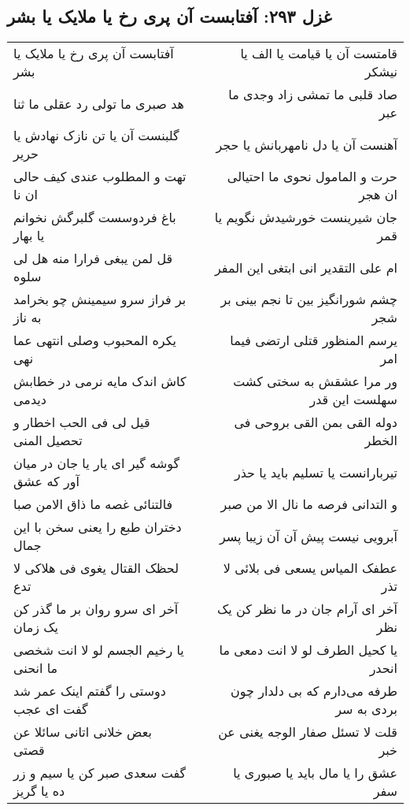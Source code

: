 \begin{center}
\section*{غزل ۲۹۳: آفتابست آن پری رخ یا ملایک یا بشر}
\label{sec:293}
\begin{longtable}{l p{0.5cm} r}
آفتابست آن پری رخ یا ملایک یا بشر
&&
قامتست آن یا قیامت یا الف یا نیشکر
\\
هد صبری ما تولی رد عقلی ما ثنا
&&
صاد قلبی ما تمشی زاد وجدی ما عبر
\\
گلبنست آن یا تن نازک نهادش یا حریر
&&
آهنست آن یا دل نامهربانش یا حجر
\\
تهت و المطلوب عندی کیف حالی ان نا
&&
حرت و المامول نحوی ما احتیالی ان هجر
\\
باغ فردوسست گلبرگش نخوانم یا بهار
&&
جان شیرینست خورشیدش نگویم یا قمر
\\
قل لمن یبغی فرارا منه هل لی سلوه
&&
ام علی التقدیر انی ابتغی این المفر
\\
بر فراز سرو سیمینش چو بخرامد به ناز
&&
چشم شورانگیز بین تا نجم بینی بر شجر
\\
یکره المحبوب وصلی انتهی عما نهی
&&
یرسم المنظور قتلی ارتضی فیما امر
\\
کاش اندک مایه نرمی در خطابش دیدمی
&&
ور مرا عشقش به سختی کشت سهلست این قدر
\\
قیل لی فی الحب اخطار و تحصیل المنی
&&
دوله القی بمن القی بروحی فی الخطر
\\
گوشه گیر ای یار یا جان در میان آور که عشق
&&
تیربارانست یا تسلیم باید یا حذر
\\
فالتنائی غصه ما ذاق الامن صبا
&&
و التدانی فرصه ما نال الا من صبر
\\
دختران طبع را یعنی سخن با این جمال
&&
آبرویی نیست پیش آن آن زیبا پسر
\\
لحظک القتال یغوی فی هلاکی لا تدع
&&
عطفک المیاس یسعی فی بلائی لا تذر
\\
آخر ای سرو روان بر ما گذر کن یک زمان
&&
آخر ای آرام جان در ما نظر کن یک نظر
\\
یا رخیم الجسم لو لا انت شخصی ما انحنی
&&
یا کحیل الطرف لو لا انت دمعی ما انحدر
\\
دوستی را گفتم اینک عمر شد گفت ای عجب
&&
طرفه می‌دارم که بی دلدار چون بردی به سر
\\
بعض خلانی اتانی سائلا عن قصتی
&&
قلت لا تسئل صفار الوجه یغنی عن خبر
\\
گفت سعدی صبر کن یا سیم و زر ده یا گریز
&&
عشق را یا مال باید یا صبوری یا سفر
\\
\end{longtable}
\end{center}
